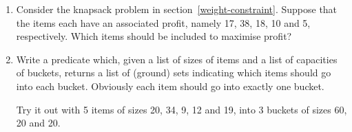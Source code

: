 \begin{enumerate}

\item

Consider the knapsack problem in section~\ref{weight-constraint}.
Suppose that the items each have an associated profit, namely 17, 38, 18, 10
and 5, respectively.  Which items should be included to maximise profit?


\item

Write a predicate which, given a list of sizes of items and a list of
capacities of buckets, returns a list of (ground) sets indicating which
items should go into each bucket.  Obviously each item should go into
exactly one bucket.

Try it out with 5 items of sizes 20, 34, 9, 12 and 19, into 3 buckets of
sizes 60, 20 and 20.

\end{enumerate}


